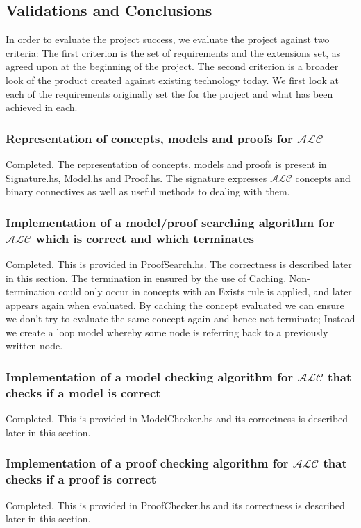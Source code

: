 \subsection {Validations and Conclusions}
\label{sec:valandconc}

In order to evaluate the project success, we evaluate the project against two criteria:
The first criterion is the set of requirements and the extensions set, as agreed upon at the beginning of the project.
The second criterion is a broader look of the product created against existing technology today.
We first look at each of the requirements originally set the for the project and what has been achieved in each.

\subsubsection*{Representation of concepts, models and proofs for $\mathcal{ALC}$}
Completed. The representation of concepts, models and proofs is present in Signature.hs, Model.hs and Proof.hs. The signature expresses $\mathcal{ALC}$ concepts and binary connectives as well as useful methods to dealing with them. 
\subsubsection*{Implementation of a model/proof searching algorithm for $\mathcal{ALC}$ which is correct and which terminates}
Completed. This is provided in ProofSearch.hs. The correctness is described later in this section. The termination in ensured by the use of Caching. Non-termination could only occur in concepts with an Exists rule is applied, and later appears again when evaluated. By caching the concept evaluated we can ensure we don't try to evaluate the same concept again and hence not terminate; Instead we create a loop model whereby some node is referring back to a previously written node.
\subsubsection*{Implementation of a model checking algorithm for $\mathcal{ALC}$ that checks if a model is correct}
Completed. This is provided in ModelChecker.hs and its correctness is described later in this section. 
\subsubsection*{Implementation of a proof checking algorithm for $\mathcal{ALC}$ that checks if a proof is correct}
Completed. This is provided in ProofChecker.hs and its correctness is described later in this section. 
